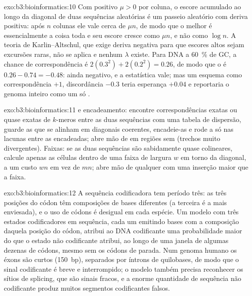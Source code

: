 \begin{solution}{exo:b3:bioinformatics:10}
Com  positivo $\mu > 0$ por coluna, o escore acumulado
ao longo da diagonal de duas sequências aleatórias é um passeio
aleatório com deriva positiva: após $n$ colunas ele vale cerca de
$\mu n$, de modo que o melhor  é essencialmente a
coisa toda e seu escore cresce como $\mu n$, e não como $\log n$. A
teoria de Karlin--Altschul, que exige deriva negativa para que escores
altos sejam excursões raras, não se aplica e nenhum $\lambda$ existe.
Para DNA a \qty{60}{\%} de GC, a chance de correspondência é
$2(0.3^{2}) + 2(0.2^{2}) = 0.26$, de modo que o  é
$0.26 - 0.74 = -0.48$: ainda negativo, e a estatística vale; mas um
esquema como correspondência $+1$, discordância $-0.3$ teria esperança
$+0.04$ e reportaria o genoma inteiro como um só .
\end{solution}

\begin{solution}{exo:b3:bioinformatics:11}
 e encadeamento: encontre correspondências exatas ou quase
exatas de $k$-meros entre as duas sequências com uma tabela de
dispersão, guarde as que se alinham em diagonais coerentes, encadeie-as
e rode a  só nas lacunas entre as 
encadeadas; abre mão de  em regiões sem  (trechos
muito divergentes). Faixas: se as duas sequências são sabidamente quase
colineares, calcule apenas as células dentro de uma faixa de largura
$w$ em torno da diagonal, a um custo $wn$ em vez de $mn$; abre mão de
qualquer  com uma inserção maior que a faixa.
\end{solution}

\begin{solution}{exo:b3:bioinformatics:12}
A sequência codificadora tem período três: as três posições do códon
têm composições de bases diferentes (a terceira é a mais enviesada), e
o uso de códons é desigual em cada espécie. Um modelo com três estados
codificadores em sequência, cada um emitindo bases com a composição
daquela posição do códon, atribui ao DNA codificante uma probabilidade
maior do que o estado não codificante atribui, ao longo de uma janela
de algumas dezenas de códons, mesmo sem os códons de parada. Num genoma
humano os éxons são curtos (\qty{150}{bp}), separados por íntrons de
quilobases, de modo que o sinal codificante é breve e interrompido; o
modelo também precisa reconhecer os sítios de splicing, que são sinais
fracos, e a enorme quantidade de sequência não codificante produz
muitos segmentos codificantes falsos.
\end{solution}


